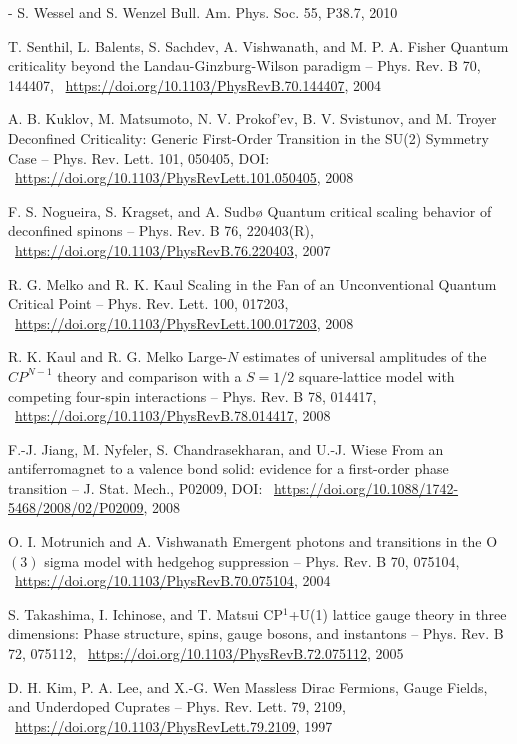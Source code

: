 \documentclass[11pt]{article}
\begin{document}
\begin{thebibliography}{3}
-%
S. Wessel and S. Wenzel  Bull. Am. Phys. Soc. 55, P38.7, 2010

T. Senthil, L. Balents, S. Sachdev, A. Vishwanath, and M. P. A. Fisher Quantum criticality beyond the Landau-Ginzburg-Wilson paradigm -- Phys. Rev. B 70, 144407,  ~\url{https://doi.org/10.1103/PhysRevB.70.144407}, 2004

A. B. Kuklov, M. Matsumoto, N. V. Prokof’ev, B. V. Svistunov, and M. Troyer Deconfined Criticality: Generic First-Order Transition in the SU(2) Symmetry Case -- Phys. Rev. Lett. 101, 050405, DOI: ~\url{https://doi.org/10.1103/PhysRevLett.101.050405}, 2008

F. S. Nogueira, S. Kragset, and A. Sudbø Quantum critical scaling behavior of deconfined spinons -- Phys. Rev. B 76, 220403(R),  ~\url{https://doi.org/10.1103/PhysRevB.76.220403}, 2007

R. G. Melko and R. K. Kaul Scaling in the Fan of an Unconventional Quantum Critical Point -- Phys. Rev. Lett. 100, 017203,  ~\url{https://doi.org/10.1103/PhysRevLett.100.017203}, 2008

R. K. Kaul and R. G. Melko Large-$N$ estimates of universal amplitudes of the $CP^{N-1}$ theory and comparison with a $S=1/2$ square-lattice model with competing four-spin interactions -- Phys. Rev. B 78, 014417,  ~\url{https://doi.org/10.1103/PhysRevB.78.014417}, 2008

F.-J. Jiang, M. Nyfeler, S. Chandrasekharan, and U.-J. Wiese From an antiferromagnet to a valence bond solid: evidence for a first-order phase transition -- J. Stat. Mech., P02009, DOI: ~\url{https://doi.org/10.1088/1742-5468/2008/02/P02009}, 2008

O. I. Motrunich and A. Vishwanath Emergent photons and transitions in the O$(3)$ sigma model with hedgehog suppression -- Phys. Rev. B 70, 075104,  ~\url{https://doi.org/10.1103/PhysRevB.70.075104}, 2004

S. Takashima, I. Ichinose, and T. Matsui CP$^1$+U(1) lattice gauge theory in three dimensions: Phase structure, spins, gauge bosons, and instantons -- Phys. Rev. B 72, 075112,  ~\url{https://doi.org/10.1103/PhysRevB.72.075112}, 2005

D. H. Kim, P. A. Lee, and X.-G. Wen Massless Dirac Fermions, Gauge Fields, and Underdoped Cuprates -- Phys. Rev. Lett. 79, 2109,  ~\url{https://doi.org/10.1103/PhysRevLett.79.2109}, 1997


\end{thebibliography}
\end{document}
